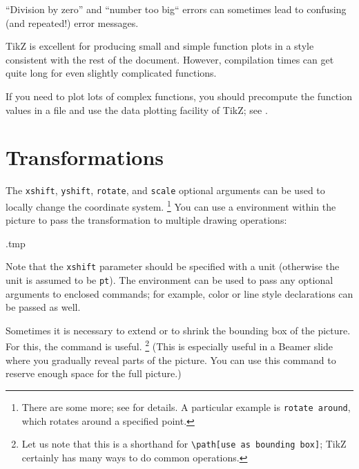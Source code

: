 \begin{warning}
``Division by zero'' and ``number too big`` errors
can sometimes lead to confusing (and repeated!) error messages.
\end{warning}

\begin{practices}
TikZ is excellent for producing small and simple function plots
in a style consistent with the rest of the document.
However, compilation times can get quite long for even slightly complicated functions.

If you need to plot lots of complex functions,
you should precompute the function values in a file
and use the data plotting facility of TikZ; see \cite[Section~22]{tikz}.
\end{practices}



%
%
\section{Transformations}

The \verb|xshift|, \verb|yshift|, \verb|rotate|, and \verb|scale| optional arguments
can be used to locally change the coordinate system.%
\footnote{There are some more; see \cite[Section~25.3]{tikz} for details.
A particular example is \texttt{rotate around}, which rotates around a specified point.}
You can use a  environment within the picture
to pass the transformation to multiple drawing operations:
%
\begin{VerbatimOut}{\jobname.tmp}
\centering
{}
\end{VerbatimOut}
\ShowExampleBelow[2]
%
Note that the \verb|xshift| parameter should be specified with a unit
(otherwise the unit is assumed to be \verb|pt|).
The  environment can be used to pass any optional arguments to enclosed commands;
for example, color or line style declarations can be passed as well.

Sometimes it is necessary to extend or to shrink the bounding box of the picture.
For this, the  command is useful.%
\footnote{Let us note that this is a shorthand for
\texttt{\textbackslash{}path[use as bounding box]};
TikZ certainly has many ways to do common operations.}
(This is especially useful in a Beamer slide where you gradually reveal parts of the picture.
You can use this command to reserve enough space for the full picture.)
\label{ex:tikz useasboundingbox}

